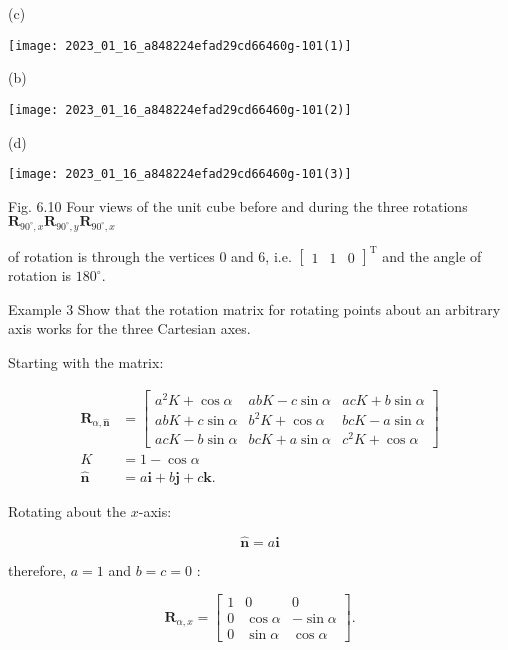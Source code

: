(c)

\begin{center}
\texttt{[image: 2023\_01\_16\_a848224efad29cd66460g-101(1)]}
\end{center}

(b)

\begin{center}
\texttt{[image: 2023\_01\_16\_a848224efad29cd66460g-101(2)]}
\end{center}

(d)

\begin{center}
\texttt{[image: 2023\_01\_16\_a848224efad29cd66460g-101(3)]}
\end{center}

Fig. 6.10 Four views of the unit cube before and during the three rotations $\mathbf{R}_{90^{\circ}, x} \mathbf{R}_{90^{\circ}, y} \mathbf{R}_{90^{\circ}, x}$

of rotation is through the vertices 0 and 6, i.e. $\left[\begin{array}{lll}1 & 1 & 0\end{array}\right]^{\mathrm{T}}$ and the angle of rotation is $180^{\circ}$.

Example 3 Show that the rotation matrix for rotating points about an arbitrary axis works for the three Cartesian axes.

Starting with the matrix:

$$
\begin{aligned}
\mathbf{R}_{\alpha, \hat{\mathbf{n}}} & =\left[\begin{array}{ccc}
a^{2} K+\cos \alpha & a b K-c \sin \alpha & a c K+b \sin \alpha \\
a b K+c \sin \alpha & b^{2} K+\cos \alpha & b c K-a \sin \alpha \\
a c K-b \sin \alpha & b c K+a \sin \alpha & c^{2} K+\cos \alpha
\end{array}\right] \\
K & =1-\cos \alpha \\
\hat{\mathbf{n}} & =a \mathbf{i}+b \mathbf{j}+c \mathbf{k} .
\end{aligned}
$$

Rotating about the $x$-axis:

$$
\hat{\mathbf{n}}=a \mathbf{i}
$$

therefore, $a=1$ and $b=c=0$ :

$$
\mathbf{R}_{\alpha, x}=\left[\begin{array}{ccc}
1 & 0 & 0 \\
0 & \cos \alpha & -\sin \alpha \\
0 & \sin \alpha & \cos \alpha
\end{array}\right] .
$$

